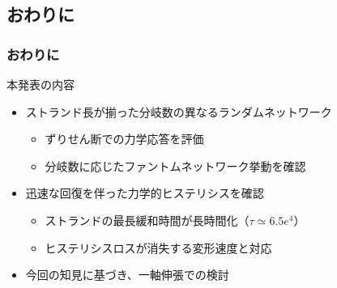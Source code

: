\documentclass[12pt, dvipdfmx]{beamer}
\begin{document}
\subsection{おわりに}
\begin{frame}
	\frametitle{おわりに}
		\begin{block}{本発表の内容}
			\begin{itemize}
				\item ストランド長が揃った分岐数の異なるランダムネットワーク
				\begin{itemize}
					\item ずりせん断での力学応答を評価
					\item 分岐数に応じたファントムネットワーク挙動を確認
				\end{itemize}
				\item 迅速な回復を伴った力学的ヒステリシスを確認
				\begin{itemize}
					\item ストランドの最長緩和時間が長時間化（$\tau \simeq 6.5e^{4}$）
					\item ヒステリシスロスが消失する変形速度と対応
				\end{itemize}
                \item 今回の知見に基づき、一軸伸張での検討
			\end{itemize}
		\end{block}
\end{frame}





\end{document}
